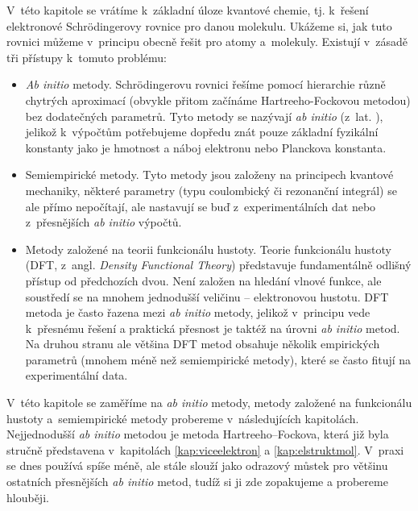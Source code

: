 V~této kapitole se vrátíme k~základní úloze kvantové chemie, tj. k~řešení elektronové Schr\"{o}dingerovy rovnice pro danou molekulu. Ukážeme si, jak tuto rovnici můžeme v~principu obecně řešit pro atomy a~molekuly.  Existují v~zásadě tři přístupy k~tomuto problému:

\begin{itemize}

\item \textit{Ab initio} metody.  Schr\"{o}dingerovu  rovnici řešíme pomocí hierarchie různě chytrých aproximací (obvykle přitom začínáme Hartreeho-Fockovou metodou) bez dodatečných parametrů. Tyto metody se nazývají \textit{ab initio} (z~lat. ), jelikož k~výpočtům potřebujeme dopředu znát pouze základní fyzikální konstanty jako je hmotnost a náboj elektronu nebo Planckova konstanta. 

\item Semiempirické metody. Tyto metody jsou založeny na principech kvantové mechaniky, některé parametry (typu coulombický či rezonanční integrál) se ale přímo nepočítají, ale nastavují se buď z~experimentálních dat nebo z~přesnějších \textit{ab initio} výpočtů.

\item Metody založené na teorii funkcionálu hustoty.  Teorie funkcionálu hustoty (DFT, z~angl. \textit{Density Functional Theory}) představuje fundamentálně odlišný přístup od předchozích dvou. Není založen na hledání vlnové funkce, ale soustředí se na mnohem jednodušší veličinu -- elektronovou hustotu. DFT metoda je často řazena mezi \textit{ab initio} metody, jelikož v~principu vede k~přesnému řešení a praktická přesnost je taktéž na úrovni \textit{ab initio} metod. Na druhou stranu ale většina DFT metod obsahuje několik empirických parametrů (mnohem méně než semiempirické metody), které se často fitují na experimentální data.

\end{itemize}

V~této kapitole se zaměříme na \textit{ab initio} metody, metody založené na funkcionálu hustoty a~semiempirické metody probereme v~následujících kapitolách. Nejjednodušší \textit{ab initio} metodou je metoda Hartreeho--Fockova, která již byla stručně představena v~kapitolách \ref{kap:viceelektron} a \ref{kap:elstruktmol}.
V~praxi se dnes používá spíše méně, ale stále slouží jako odrazový můstek pro většinu ostatních přesnějších \textit{ab initio} metod, tudíž si ji zde zopakujeme a probereme hlouběji.

